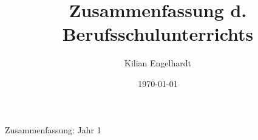 \documentclass[11pt,a4paper,oneside,ngerman]{article}
\author{Kilian Engelhardt}
\title{Zusammenfassung d. Berufsschulunterrichts}
\date{\today}
\begin{document}
	\begin{center}
		\Huge{Zusammenfassung: Jahr 1}
	\end{center}

%
\tableofcontents
\newpage
\pagestyle{fancy}
\setcounter{page}{1}


%
%
%
%
%
%
%
%
%
%
%
%
\end{document}
